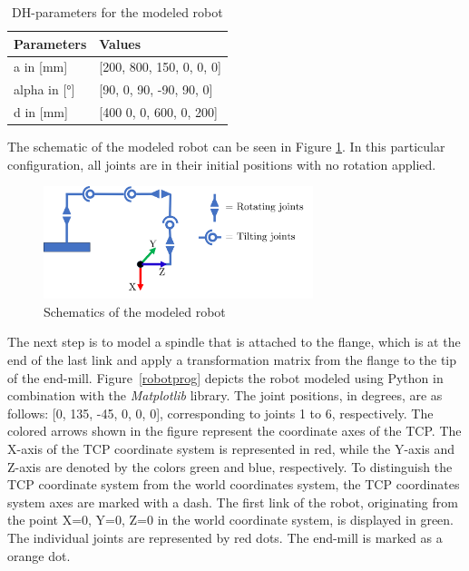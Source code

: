 
\begin{table}[H]
	\centering
	\begin{tabular}{||l|l||}
		Parameters  & Values \\
		\hline
		\hline
		\hline
		a in [mm] 	&		[200, 800, 150, 0,   0, 0] \\
		alpha in [°]	&  	[90,  0,   90,  -90, 90,  0] \\
		d in [mm]	& 		[400  0,   0,   600, 0,   200]\\
		
		\hline
		\hline
	\end{tabular}
	
	\caption{DH-parameters for the modeled robot}
	\label{DHp}
\end{table}


The schematic of the modeled robot can be seen in Figure \ref{schema}. In this particular configuration, all joints are in their initial positions with no rotation applied.\newline

\begin{figure}[H]
	\centerline{\includegraphics[width=0.7\textwidth]{figures/schema.png}}
	\caption{Schematics of the modeled robot}
	\label{schema}
\end{figure}

The next step is to model a spindle that is attached to the flange, which is at the end of the last link and apply a transformation matrix from the flange to the tip of the end-mill.
Figure~\ref{robotprog} depicts the robot modeled using Python in combination with the \textit{Matplotlib} library. The joint positions, in degrees, are as follows: [0, 135, -45, 0, 0, 0], corresponding to joints 1 to 6, respectively. The colored arrows shown in the figure represent the coordinate axes of the \acrshort{TCP}. The X-axis of the \acrshort{TCP} coordinate system is represented in red, while the Y-axis and Z-axis are denoted by the colors green and blue, respectively. To distinguish the \acrshort{TCP} coordinate system from the world coordinates system, the \acrshort{TCP} coordinates system axes are marked with a dash. The first link of the robot, originating from the point X=0, Y=0, Z=0 in the world coordinate system, is displayed in green. The individual joints are represented by red dots. The end-mill is marked as a orange dot.


